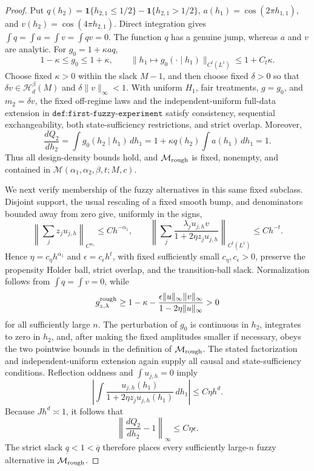 \documentclass{article}
\begin{document}
\begin{proof}
Put \(q(h_2)=\mathbf 1\{h_{2,1}\le 1/2\}-\mathbf 1\{h_{2,1}>1/2\}\), \(a(h_1)=\cos(2\pi h_{1,1})\), and \(v(h_2)=\cos(4\pi h_{2,1})\). Direct integration gives \(\int q=\int a=\int v=\int qv=0\). The function \(q\) has a genuine jump, whereas \(a\) and \(v\) are analytic. For \(g_0=1+\kappa aq\),
\[
1-\kappa\le g_0\le 1+\kappa,\qquad \|h_1\mapsto g_0(\cdot\mid h_1)\|_{C^t(L^1)}\le 1+C_t\kappa.
\]
Choose fixed \(\kappa>0\) within the slack \(M-1\), and then choose fixed \(\delta>0\) so that \(\delta v\in\mathcal H_d^\beta(M)\) and \(\delta\|v\|_\infty<1\). With uniform \(H_1\), fair treatments, \(g=g_0\), and \(m_2=\delta v\), the fixed off-regime laws and the independent-uniform full-data extension in \(\texttt{def:first-fuzzy-experiment}\) satisfy consistency, sequential exchangeability, both state-sufficiency restrictions, and strict overlap. Moreover,
\[
\frac{dQ_2}{dh_2}=\int g_0(h_2\mid h_1)\,dh_1=1+\kappa q(h_2)\int a(h_1)\,dh_1=1.
\]
Thus all design-density bounds hold, and \(\mathcal M_{\rm rough}\) is fixed, nonempty, and contained in \(\mathcal M(\alpha_1,\alpha_2,\beta,t;M,c)\).

We next verify membership of the fuzzy alternatives in this same fixed subclass. Disjoint support, the usual rescaling of a fixed smooth bump, and denominators bounded away from zero give, uniformly in the signs,
\[
\left\|\sum_j z_j u_{j,h}\right\|_{C^{\alpha_1}}\le C h^{-\alpha_1},\qquad
\left\|\sum_j\frac{\lambda_j u_{j,h}v}{1+2\eta z_j u_{j,h}}\right\|_{C^t(L^1)}\le C h^{-t}.
\]
Hence \(\eta=c_\eta h^{\alpha_1}\) and \(\epsilon=c_\epsilon h^t\), with fixed sufficiently small \(c_\eta,c_\epsilon>0\), preserve the propensity Holder ball, strict overlap, and the transition-ball slack. Normalization follows from \(\int q=\int v=0\), while
\[
g^{\rm rough}_{z,\lambda}\ge 1-\kappa-\frac{\epsilon\|u\|_\infty\|v\|_\infty}{1-2\eta\|u\|_\infty}>0
\]
for all sufficiently large \(n\). The perturbation of \(g_0\) is continuous in \(h_2\), integrates to zero in \(h_2\), and, after making the fixed amplitudes smaller if necessary, obeys the two pointwise bounds in the definition of \(\mathcal M_{\rm rough}\). The stated factorization and independent-uniform extension again supply all causal and state-sufficiency conditions. Reflection oddness and \(\int u_{j,h}=0\) imply
\[
\left|\int\frac{u_{j,h}(h_1)}{1+2\eta z_j u_{j,h}(h_1)}\,dh_1\right|\le C\eta h^d.
\]
Because \(Jh^d\asymp 1\), it follows that
\[
\left\|\frac{dQ_2}{dh_2}-1\right\|_\infty\le C\eta\epsilon.
\]
The strict slack \(\underline q<1<\overline q\) therefore places every sufficiently large-\(n\) fuzzy alternative in \(\mathcal M_{\rm rough}\).


\end{proof}
\end{document}
